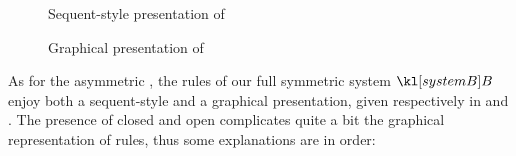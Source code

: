 %   

\begin{figure*}
  
  \caption{Sequent-style presentation of }
\end{figure*}

\begin{figure*}
  
  \caption{Graphical presentation of }
\end{figure*}

As for the asymmetric  , the rules of our full symmetric
 system $\sysB$ enjoy both a sequent-style and a graphical
presentation, given respectively in  and .
The presence of closed and open  complicates quite a bit the graphical
representation of rules, thus some explanations are in order:
